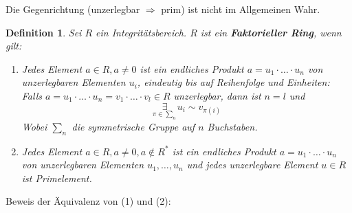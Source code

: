 \documentclass{article}
\newtheorem{defi}[thm]{Definition}
\begin{document}
\color{blue}
Die Gegenrichtung (unzerlegbar $\Rightarrow$ prim)
ist nicht im Allgemeinen Wahr.
\color{black}
\begin{defi}
    Sei $R$ ein Integritätsbereich.
    $R$ ist ein \textbf{Faktorieller Ring}, wenn
    gilt:
    \begin{enumerate}[(1)]
        \item
            Jedes Element $a\in R,a\neq 0$ ist ein
            endliches Produkt $a=u_1\cdot\hdots\cdot u_n$ von
            unzerlegbaren Elementen $u_i$,
            eindeutig bis auf Reihenfolge und Einheiten:
            Falls
            $a=u_1\cdot\hdots\cdot u_n=
            v_1\cdot\hdots\cdot v_l\in R$ unzerlegbar, dann
            ist $n=l$ und
            \begin{equation*}
                \underset{\pi\in\sum_n}\exists u_i\sim
                v_{\pi(i)}
            \end{equation*}
            Wobei $\sum_n$ die symmetrische Gruppe auf $n$
            Buchstaben.
        \item
            Jedes Element $a\in R,a\neq 0,a\notin R^*$
            ist ein endliches Produkt
            $a=u_1\cdot\hdots\cdot u_n$ von unzerlegbaren
            Elementen $u_1,\hdots,u_n$ und jedes unzerlegbare
            Element $u\in R$ ist Primelement.
    \end{enumerate}
\end{defi}
Beweis der Äquivalenz von (1) und (2):
\end{document}
